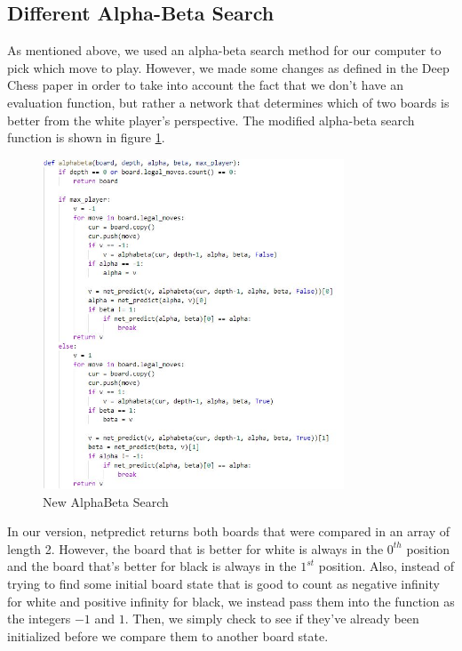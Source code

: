 \documentclass[12pt]{article}
\begin{document}
    \subsection{Different Alpha-Beta Search}

    As mentioned above, we used an alpha-beta search method for our computer to pick which move to play. However, we made some changes as defined in the Deep Chess paper in order to take into account the fact that we don't have an evaluation function, but rather a network that determines which of two boards is better from the white player's perspective. The modified alpha-beta search function is shown in figure \ref{fig:alphabeta}.

    \begin{singlespace}
        \begin{figure}[ht]
            \centering
            \caption{New AlphaBeta Search}
            \label{fig:alphabeta}
            \includegraphics[width=0.8\textwidth]{alphabeta.jpg}
        \end{figure}
    \end{singlespace}

    In our version, netpredict returns both boards that were compared in an array of length 2. However, the board that is better for white is always in the $0^{th}$ position and the board that's better for black is always in the $1^{st}$ position. Also, instead of trying to find some initial board state that is good to count as negative infinity for white and positive infinity for black, we instead pass them into the function as the integers $-1$ and $1$. Then, we simply check to see if they've already been initialized before we compare them to another board state. 
    
\end{document}
